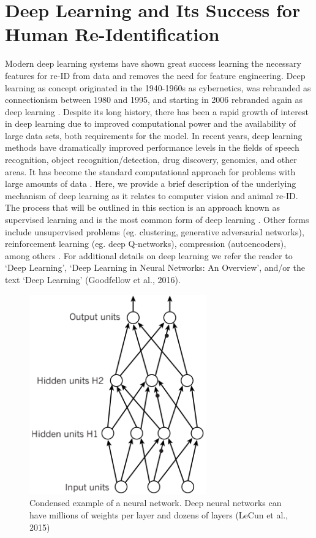 \documentclass[11pt]{article}
\begin{document}
\section*{Deep Learning and Its Success for Human Re-Identification}

Modern deep learning systems have shown great success learning the necessary features for re-ID from data and removes the need for feature engineering. Deep learning as concept originated in the 1940-1960s as cybernetics, was rebranded as connectionism between 1980 and 1995, and starting in 2006 rebranded again as deep learning \cite{mcculloch1943logical, hebb2005organization, minsky2017perceptrons, rumelhart1986learning, hinton2006fast}. Despite its long history, there has been a rapid growth of interest in deep learning due to improved computational power and the availability of large data sets, both requirements for the model. In recent years, deep learning methods have dramatically improved performance levels in the fields of speech recognition, object recognition/detection, drug discovery, genomics, and other areas. It has become the standard computational approach for problems with large amounts of data \cite{lecun2015deep}. Here, we provide a brief description of the underlying mechanism of deep learning as it relates to computer vision and animal re-ID. The process that will be outlined in this section is an approach known as supervised learning and is the most common form of deep learning \cite{lecun2015deep}. Other forms include unsupervised problems (eg. clustering, generative adversarial networks), reinforcement learning (eg. deep Q-networks), compression (autoencoders), among others \cite{goodfellow2016deep}. For additional details on deep learning we refer the reader to `Deep Learning', `Deep Learning in Neural Networks: An Overview', and/or the text `Deep Learning' \cite{lecun2015deep, schmidhuber2015deep, goodfellow2016deep}(Goodfellow et al., 2016).
\newline

\begin{figure}
  \begin{flushright}
    \includegraphics[width=3in]{BasicNeuralNet.png}
  \end{flushright}
  \caption{Condensed example of a neural network. Deep neural networks can have millions of weights per layer and dozens of layers (LeCun et al., 2015)}
\end{figure}
\end{document}
